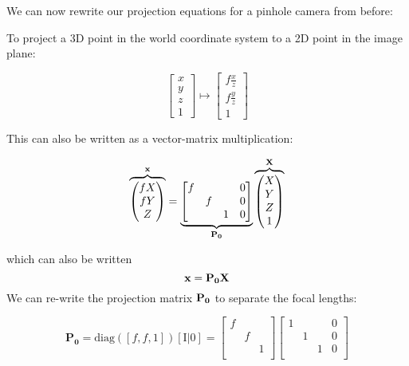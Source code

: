 \documentclass{beamer}
\begin{document}
\begin{frame}[allowframebreaks]
\framebreak

We can now rewrite our projection equations for a pinhole camera from before:

To project a 3D point in the world coordinate system to a 2D point in the image plane:

\[
  \begin{bmatrix}
    x \\ y \\ z \\ 1
  \end{bmatrix} \mapsto
  \begin{bmatrix}
    f \frac{x}{z} \\ f \frac{y}{z} \\ 1
  \end{bmatrix}
\]

This can also be written as a vector-matrix multiplication:

\[
  \overbrace{\begin{pmatrix}
    f X \\ f Y \\ Z
  \end{pmatrix}}^{\bf x} =
  \underbrace{\begin{bmatrix}
    f & & & 0\\
    & f & & 0\\
    & & 1 & 0\\
  \end{bmatrix}}_{\bf P_{0}}
  \overbrace{\begin{pmatrix}
X \\Y \\ Z \\ 1
\end{pmatrix}}^{\bf X}
\]


which can also be written
\[
  \bf x = P_{0}X
\]
We can re-write the projection matrix $\bf P_{0}$ to separate the focal lengths:

\[
  \mathbf{P_{0}} = \text{diag}([f,f,1])[\text{I}|0] = \begin{bmatrix}
    f & & \\
    & f & \\
    & & 1 \\
  \end{bmatrix}\begin{bmatrix}
    1 & & & 0 \\
    & 1 & & 0 \\
    & & 1 & 0 \\
  \end{bmatrix}
\]
\framebreak


\end{frame}
\end{document}
